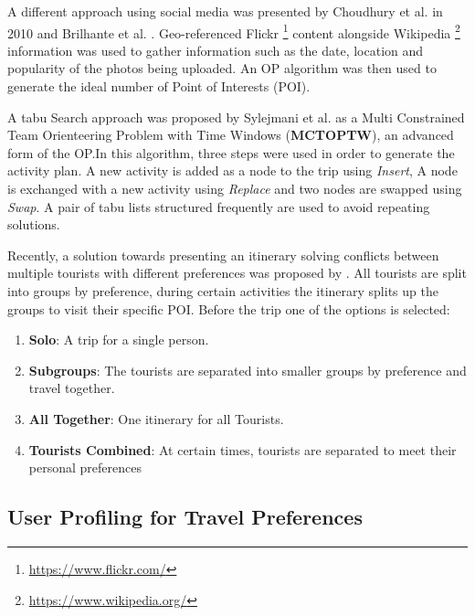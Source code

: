     A different approach using social media was presented by Choudhury et
    al. \cite{DeChoudhury2010} in 2010 and Brilhante et al.
    \cite{RamalhoBrilhante2014}. Geo-referenced Flickr
    \footnote{\url{https://www.flickr.com/}} content alongside Wikipedia
    \footnote{\url{https://www.wikipedia.org/}} information was used to
    gather information such as the date, location and popularity of the
    photos being uploaded. An OP algorithm was then used to generate the
    ideal number of Point of Interests (POI).

    A tabu Search approach was proposed by Sylejmani et al.
    \cite{Sylejmani2012} as a Multi Constrained Team Orienteering Problem
    with Time Windows (\textbf{MCTOPTW}), an advanced form of the OP.In
    this algorithm, three steps were used in order to generate the
    activity plan. A new activity is added as a node to the trip using
    \emph{Insert}, A node is exchanged with a new activity using
    \emph{Replace} and two nodes are swapped using \emph{Swap}. A pair of
    tabu lists structured frequently are used to avoid repeating
    solutions.


    Recently, a solution towards presenting an itinerary solving
    conflicts between multiple tourists with different preferences was
    proposed by  \cite{Sylejmani2017}. All tourists are split into
    groups by preference, during certain activities the itinerary
    splits up the groups to visit their specific POI. Before the trip
    one of the options is selected: 
    \begin{enumerate}
        \item \textbf{Solo}: A trip for a single person.
        \item \textbf{Subgroups}: The tourists are separated into
        smaller groups by preference and travel together.
        \item \textbf{All Together}: One itinerary for all Tourists.
        \item \textbf{Tourists Combined}: At certain times, tourists are separated to
    meet their personal preferences

    \end{enumerate}





\subsection{User Profiling for Travel Preferences}
 
